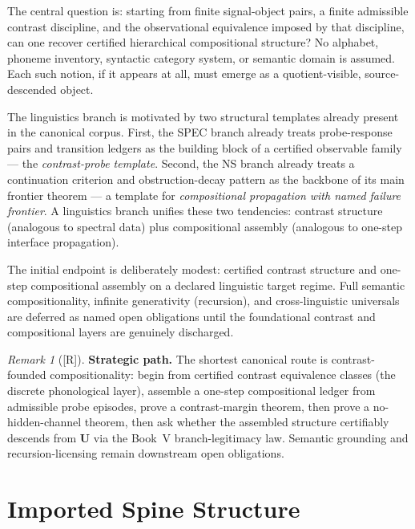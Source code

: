\documentclass[12pt,oneside]{amsbook}
\theoremstyle{plain}
\theoremstyle{definition}
\theoremstyle{remark}
\newtheorem{remark}[theorem]{Remark}
\newcommand{\status}[1]{\textup{[#1]}}
\begin{document}
The central question is: starting from finite signal-object pairs, a
finite admissible contrast discipline, and the observational equivalence
imposed by that discipline, can one recover certified hierarchical
compositional structure? No alphabet, phoneme inventory, syntactic
category system, or semantic domain is assumed. Each such notion, if it appears at all,
must emerge as a quotient-visible, source-descended object.

The linguistics branch is motivated by two structural templates already
present in the canonical corpus. First, the SPEC branch already treats
probe-response pairs and transition ledgers as the building block of a
certified observable family --- the \emph{contrast-probe template}.
Second, the NS branch already treats a continuation criterion and
obstruction-decay pattern as the backbone of its main frontier theorem
--- a template for \emph{compositional propagation with named failure
frontier}. A linguistics branch unifies these two tendencies: contrast
structure (analogous to spectral data) plus compositional assembly
(analogous to one-step interface propagation).

The initial endpoint is deliberately modest: certified contrast
structure and one-step compositional assembly on a declared linguistic
target regime. Full semantic compositionality, infinite generativity
(recursion), and cross-linguistic universals are deferred as named open
obligations until the foundational contrast and compositional layers are
genuinely discharged.

\begin{remark}[\status{R}]\label{rem:ling-strategic-path}
\textbf{Strategic path.}
The shortest canonical route is contrast-founded compositionality:
begin from certified contrast equivalence classes (the discrete
phonological layer), assemble a one-step compositional ledger from
admissible probe episodes, prove a contrast-margin theorem, then prove a
no-hidden-channel theorem, then ask whether the assembled structure
certifiably descends from $\mathbf{U}$ via the Book~V branch-legitimacy
law. Semantic grounding and recursion-licensing remain downstream open
obligations.
\end{remark}

\section{Imported Spine Structure}\label{sec:ling-imports}
\end{document}
